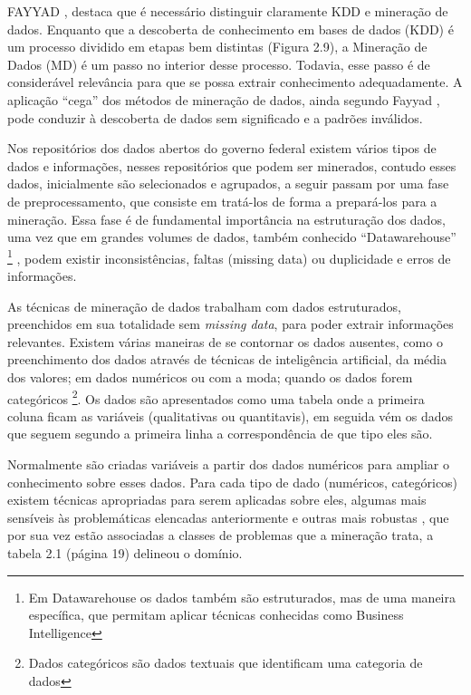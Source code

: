 FAYYAD \cite{FayyadUeoutros}, destaca que é necessário distinguir claramente KDD e mineração de dados. Enquanto que a descoberta de conhecimento em bases de dados (KDD) é um processo dividido em etapas bem distintas (Figura 2.9), a Mineração de Dados (MD) é um passo no interior desse processo. 
Todavia, esse passo é de considerável relevância para que se possa extrair conhecimento adequadamente. 
A aplicação “cega” dos métodos de mineração de dados, ainda segundo Fayyad \cite{FayyadUeoutros}, pode conduzir à descoberta de dados sem significado e a padrões inválidos. 

Nos repositórios dos dados abertos do governo federal \cite{DadosGoverno} existem vários tipos de dados e informações, nesses repositórios que podem ser minerados, contudo esses dados, inicialmente são selecionados e agrupados, a seguir passam por uma fase de preprocessamento, que consiste em tratá-los de forma a prepará-los para a mineração. Essa fase é de fundamental importância na estruturação dos dados, uma vez que em grandes volumes de dados, também conhecido ``Datawarehouse'' \footnote{Em Datawarehouse os dados também são estruturados, mas de uma maneira específica, que permitam aplicar técnicas conhecidas como Business Intelligence } \cite{RalphKimball2013}, podem existir inconsistências, faltas (missing data) ou 
duplicidade e erros de informações.

As técnicas de mineração de dados trabalham com dados estruturados, preenchidos em sua totalidade sem \textit{missing data}, para poder extrair informações relevantes.
Existem várias maneiras de se contornar os dados ausentes, como o preenchimento dos dados através de técnicas de inteligência artificial, da média dos valores; em dados numéricos 
ou com a moda; quando os dados forem categóricos \footnote{Dados categóricos são dados textuais que identificam uma categoria de dados}. Os dados são apresentados como uma tabela onde a primeira coluna ficam as variáveis (qualitativas ou quantitavis), em seguida vém os dados que seguem segundo a primeira linha a correspondência de que tipo eles são. 

Normalmente são criadas variáveis a partir dos dados numéricos para ampliar o conhecimento sobre esses dados. Para cada tipo de dado (numéricos, categóricos) existem técnicas apropriadas para serem aplicadas sobre eles, algumas mais sensíveis às problemáticas elencadas anteriormente
e outras mais robustas \cite{DataMining2}, que por sua vez estão associadas a classes de problemas que a mineração trata, a tabela 2.1 (página 19) delineou o domínio.

